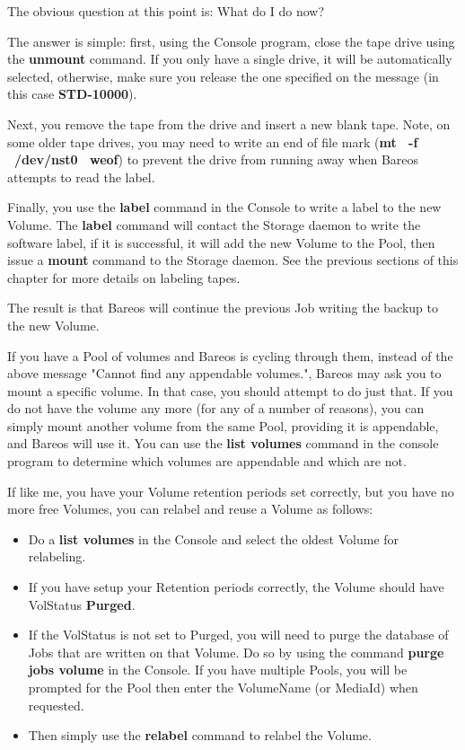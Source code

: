 The obvious question at this point is: What do I do now?

The answer is simple: first, using the Console program, close the tape drive
using the {\bf unmount} command. If you only have a single drive, it will be
automatically selected, otherwise, make sure you release the one specified on
the message (in this case {\bf STD-10000}).

Next, you remove the tape from the drive and insert a new blank tape. Note, on
some older tape drives, you may need to write an end of file mark ({\bf mt \
-f \ /dev/nst0 \ weof}) to prevent the drive from running away when Bareos
attempts to read the label.

Finally, you use the {\bf label} command in the Console to write a label to
the new Volume. The {\bf label} command will contact the Storage daemon to
write the software label, if it is successful, it will add the new Volume to
the Pool, then issue a {\bf mount} command to the Storage daemon. See the
previous sections of this chapter for more details on labeling tapes.

The result is that Bareos will continue the previous Job writing the backup to
the new Volume.

If you have a Pool of volumes and Bareos is cycling through them, instead of
the above message "Cannot find any appendable volumes.", Bareos may ask you
to mount a specific volume. In that case, you should attempt to do just that.
If you do not have the volume any more (for any of a number of reasons), you
can simply mount another volume from the same Pool, providing it is
appendable, and Bareos will use it. You can use the {\bf list volumes} command
in the console program to determine which volumes are appendable and which are
not.

If like me, you have your Volume retention periods set correctly, but you have
no more free Volumes, you can relabel and reuse a Volume as follows:

\begin{itemize}
\item Do a {\bf list volumes} in the Console and select the oldest  Volume for
   relabeling.
\item If you have setup your Retention periods correctly, the  Volume should
   have VolStatus {\bf Purged}.
\item If the VolStatus is not set to Purged, you will need to purge  the
   database of Jobs that are written on that Volume. Do so  by using the command
   {\bf purge jobs volume} in the Console.  If you have multiple Pools, you will
be prompted for the  Pool then enter the VolumeName (or MediaId) when
requested.
\item Then simply use the {\bf relabel} command to relabel the  Volume.
   \end{itemize}

